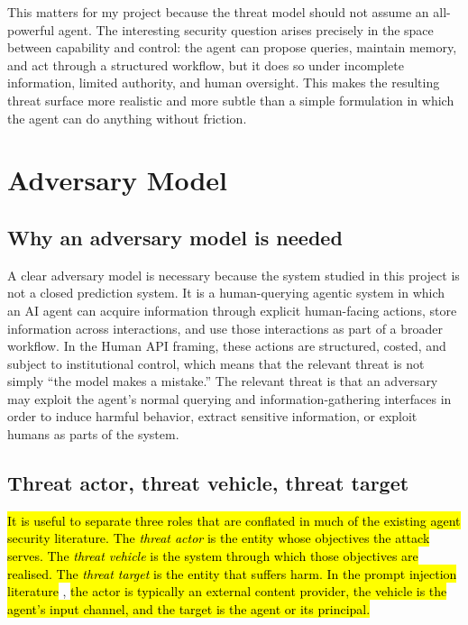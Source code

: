\documentclass[11pt]{article}
\begin{document}
This matters for my project because the threat model should not assume an all-powerful agent. The interesting security question arises precisely in the space between capability and control: the agent can propose queries, maintain memory, and act through a structured workflow, but it does so under incomplete information, limited authority, and human oversight. This makes the resulting threat surface more realistic and more subtle than a simple formulation in which the agent can do anything without friction.

\section{Adversary Model}\label{sec:adversary}

\subsection{Why an adversary model is needed}

A clear adversary model is necessary because the system studied in this project is not a closed prediction system. It is a human-querying agentic system in which an AI agent can acquire information through explicit human-facing actions, store information across interactions, and use those interactions as part of a broader workflow. In the Human API framing, these actions are structured, costed, and subject to institutional control, which means that the relevant threat is not simply ``the model makes a mistake.'' The relevant threat is that an adversary may exploit the agent's normal querying and information-gathering interfaces in order to induce harmful behavior, extract sensitive information, or exploit humans as parts of the system. \citep{oliver2026humanapi,franklin2026agenttraps,schroeder2025multiagentsecurity}

\subsection{Threat actor, threat vehicle, threat target}

\hl{It is useful to separate three roles that are conflated in much of the existing agent security literature. The \emph{threat actor} is the entity whose objectives the attack serves. The \emph{threat vehicle} is the system through which those objectives are realised. The \emph{threat target} is the entity that suffers harm. In the prompt injection literature }\citep{greshake2023notwhatyousigned,franklin2026agenttraps}, \hl{the actor is typically an external content provider, the vehicle is the agent's input channel, and the target is the agent or its principal.}
\end{document}
